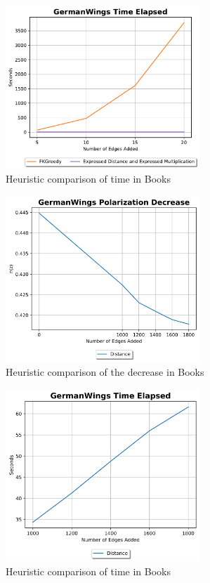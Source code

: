 \begin{figure}[H]
	\centering
	\includegraphics[width=0.65\textwidth]{Figures/GermanWings Time Elapsed}
	\caption{Heuristic comparison of time in Books}
	\label{fig:germanwings_time}
\end{figure}
\clearpage

\begin{figure}[H]
	\centering
	\includegraphics[width=0.65\textwidth]{Figures/GermanWings Polarization Decrease 2}
	\caption{Heuristic comparison of the decrease in Books}
	\label{fig:germanwings_pol}
\end{figure}


\begin{figure}[H]
	\centering
	\includegraphics[width=0.65\textwidth]{Figures/GermanWings Time Elapsed 2}
	\caption{Heuristic comparison of time in Books}
	\label{fig:germanwings_time}
\end{figure}
\clearpage


